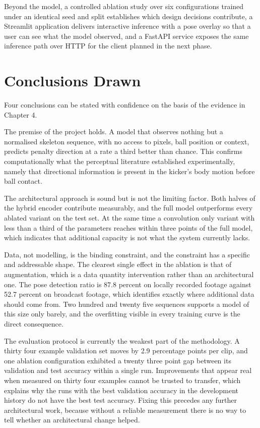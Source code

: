 Beyond the model, a controlled ablation study over six configurations trained under an identical seed and split establishes which design decisions contribute, a Streamlit application delivers interactive inference with a pose overlay so that a user can see what the model observed, and a FastAPI service exposes the same inference path over HTTP for the client planned in the next phase.

\section{Conclusions Drawn}

Four conclusions can be stated with confidence on the basis of the evidence in Chapter 4.

The premise of the project holds. A model that observes nothing but a normalised skeleton sequence, with no access to pixels, ball position or context, predicts penalty direction at a rate a third better than chance. This confirms computationally what the perceptual literature established experimentally, namely that directional information is present in the kicker's body motion before ball contact.

The architectural approach is sound but is not the limiting factor. Both halves of the hybrid encoder contribute measurably, and the full model outperforms every ablated variant on the test set. At the same time a convolution only variant with less than a third of the parameters reaches within three points of the full model, which indicates that additional capacity is not what the system currently lacks.

Data, not modelling, is the binding constraint, and the constraint has a specific and addressable shape. The clearest single effect in the ablation is that of augmentation, which is a data quantity intervention rather than an architectural one. The pose detection ratio is 87.8 percent on locally recorded footage against 52.7 percent on broadcast footage, which identifies exactly where additional data should come from. Two hundred and twenty five sequences supports a model of this size only barely, and the overfitting visible in every training curve is the direct consequence.

The evaluation protocol is currently the weakest part of the methodology. A thirty four example validation set moves by 2.9 percentage points per clip, and one ablation configuration exhibited a twenty three point gap between its validation and test accuracy within a single run. Improvements that appear real when measured on thirty four examples cannot be trusted to transfer, which explains why the runs with the best validation accuracy in the development history do not have the best test accuracy. Fixing this precedes any further architectural work, because without a reliable measurement there is no way to tell whether an architectural change helped.

